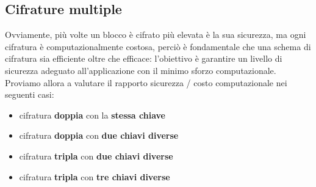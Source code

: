 \subsection{Cifrature multiple}
Ovviamente, più volte un blocco è cifrato più elevata è la sua sicurezza, ma ogni cifratura è computazionalmente costosa, perciò è fondamentale che una schema di cifratura sia efficiente oltre che efficace: l'obiettivo è garantire un livello di sicurezza adeguato all'applicazione con il minimo sforzo computazionale. \\
Proviamo allora a valutare il rapporto sicurezza / costo computazionale nei seguenti casi:
\begin{itemize}
\item cifratura \textbf{doppia} con la \textbf{stessa chiave}
\item cifratura \textbf{doppia} con \textbf{due chiavi diverse}
\item cifratura \textbf{tripla} con \textbf{due chiavi diverse}
\item cifratura \textbf{tripla} con \textbf{tre chiavi diverse}
\end{itemize}
